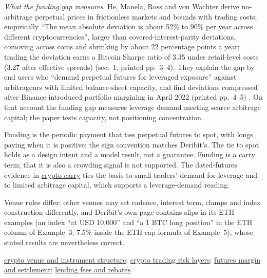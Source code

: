 \begin{qfmechanism}
\emph{What the funding gap measures}. He, Manela, Ross and von Wachter derive no-arbitrage perpetual prices in frictionless markets and bounds with trading costs; empirically ``The mean absolute deviation is about 52\% to 90\% per year across different cryptocurrencies'', larger than covered-interest-parity deviations, comoving across coins and shrinking by about 22 percentage points a year; trading the deviation earns a Bitcoin Sharpe ratio of 3.35 under retail-level costs (3.27 after effective spreads) (sec.~1, printed pp.~3--4). They explain the gap by end users who ``demand perpetual futures for leveraged exposure'' against arbitrageurs with limited balance-sheet capacity, and find deviations compressed after Binance introduced portfolio margining in April 2022 (printed pp.~4--5) \citep[arXiv v7, sec.~1, printed pp.~3--5]{roadmap-perpetual-fundamentals}. On that account the funding gap measures leverage demand meeting scarce arbitrage capital; the paper tests capacity, not positioning concentration.

 Funding is the periodic payment that ties perpetual futures to spot, with longs paying when it is positive; the sign convention matches Deribit's. The tie to spot holds as a design intent and a model result, not a guarantee. Funding is a carry term; that it is also a crowding signal is not supported. The dated-futures evidence in \hyperref[ev:crypto-dated-futures-carry]{crypto carry} ties the basis to small traders' demand for leverage and to limited arbitrage capital, which supports a leverage-demand reading.

Venue rules differ: other venues may set cadence, interest term, clamps and index construction differently, and Deribit's own page contains slips in its ETH examples (an index ``at USD 10,000'' and ``a 1 BTC long position'' in the ETH column of Example~3; 7.5\% inside the ETH cap formula of Example~5), whose stated results are nevertheless correct.

 \hyperref[def:crypto-venue-instrument-structure]{crypto venue and instrument structure}; \hyperref[def:crypto-trading-risk-layers]{crypto trading risk layers}; \hyperref[mech:futures-margin-settlement]{futures margin and settlement}; \hyperref[def:securities-lending-fee-rebate]{lending fees and rebates}.

\end{qfmechanism}

